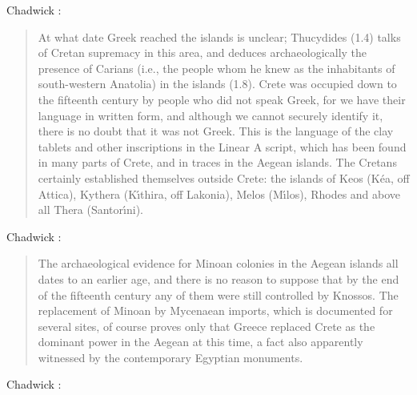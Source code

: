\documentclass{article}
\begin{document}
Chadwick \cite[p.~4]{chadwick}:

\begin{quote}
At what 
date Greek reached the islands is unclear; Thucydides (1.4) talks of Cretan
supremacy in this area, and deduces archaeologically the presence of
Carians (i.e., the people whom he knew as the inhabitants of south-western
Anatolia) in the islands (1.8). Crete was occupied down to the fifteenth
century by people who did not speak Greek, for we have their language in
written form, and although we cannot securely identify it, there is no
doubt that it was not Greek. This is the
language of the clay tablets and other inscriptions in the Linear A script,
which has been found in many parts of Crete, and in traces in the Aegean
islands. The Cretans certainly established themselves outside Crete: the
islands of Keos (K\'ea, off Attica), Kythera (K{\'\i}thira, off Lakonia), Melos
(M{\'\i}los), Rhodes and above all Thera (Santor{\'\i}ni).
\end{quote}

Chadwick \cite[p.~50]{chadwick}:

\begin{quote}
The archaeological evidence for Minoan colonies in the Aegean islands
all dates to an earlier age, and there is no reason to suppose that by the end 
of the fifteenth century any of them were still controlled by Knossos. The
replacement of Minoan by Mycenaean imports, which is documented for
several sites, of course proves only that Greece replaced Crete as the
dominant power in the Aegean at this time, a fact also apparently
witnessed by the contemporary Egyptian monuments.
\end{quote}

Chadwick \cite[pp.~102--103]{chadwick}:
\end{document}
